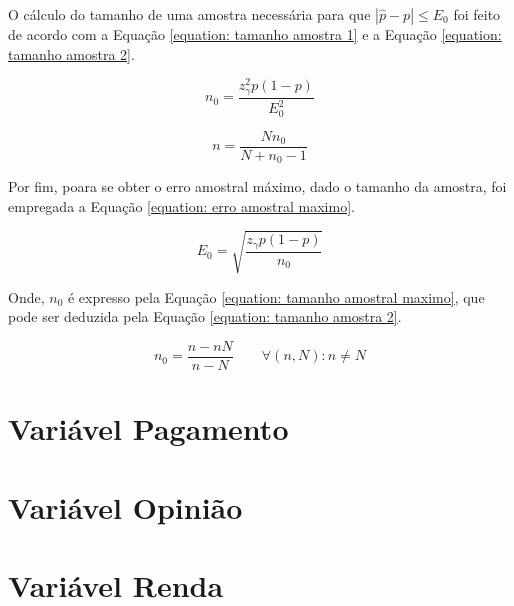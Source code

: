 \documentclass[10pt,a4paper,oneside]{article}
\begin{document}
	O cálculo do tamanho de uma amostra necessária para que $|\hat{p} - p|
	\leq E_0$ foi feito de acordo com a Equação \ref{equation: tamanho amostra
	1} e a Equação \ref{equation: tamanho amostra 2}.

	\begin{equation}
		n_0 = \frac{z_\gamma^2 p(1-p)}{E_0^2}
		\label{equation: tamanho amostra 1}
	\end{equation}

	\begin{equation}
		n = \frac{N n_0}{N + n_0 - 1}
		\label{equation: tamanho amostra 2}
	\end{equation}

	Por fim, poara se obter o erro amostral máximo, dado o tamanho da
	amostra, foi empregada a Equação \ref{equation: erro amostral maximo}.
	
	\begin{equation}
		E_0 = \sqrt{\frac{z_\gamma p(1 - p) }{n_0}}
		\label{equation: erro amostral maximo}
	\end{equation}
	
	Onde, $n_0$ é expresso pela Equação	\ref{equation: tamanho amostral
	maximo}, que pode ser deduzida pela Equação \ref{equation: tamanho
	amostra 2}.

	\begin{equation}
		n_0 = \frac{n-n N}{n-N} \qquad \forall (n, N) : n \neq N
	\label{equation: tamanho amostral maximo}
	\end{equation}

\section{Variável Pagamento}
\label{questao:4}


\section{Variável Opinião}
\label{questao:5}


\section{Variável Renda}
\label{questao:6}

\end{document}
